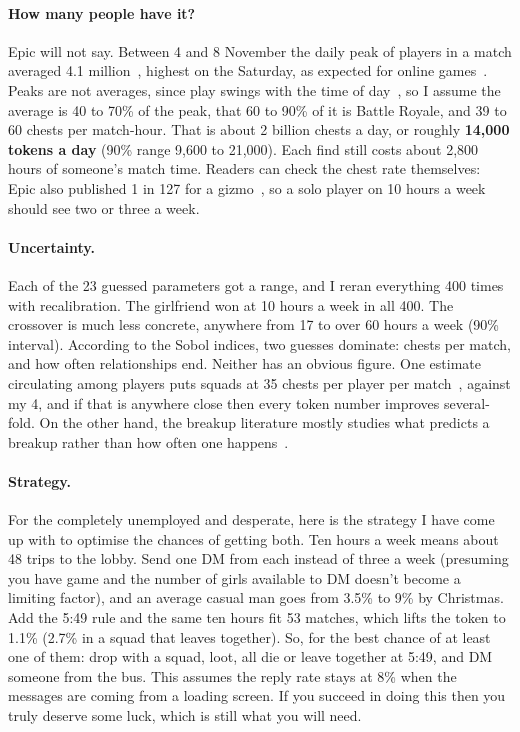 \documentclass[11pt]{article}
\theoremstyle{definition}
\theoremstyle{plain}
\begin{document}
\paragraph{How many people have it?} Epic will not say. Between 4 and 8 November the daily peak of players in a match averaged 4.1 million~\cite{endgame}, highest on the Saturday, as expected for online games~\cite{vihanga}. Peaks are not averages, since play swings with the time of day~\cite{henderson}, so I assume the average is 40 to 70\% of the peak, that 60 to 90\% of it is Battle Royale, and 39 to 60 chests per match-hour. That is about 2 billion chests a day, or roughly \textbf{14{,}000 tokens a day} (90\% range 9{,}600 to 21{,}000). Each find still costs about 2{,}800 hours of someone's match time. Readers can check the chest rate themselves: Epic also published 1 in 127 for a gizmo~\cite{forbes}, so a solo player on 10 hours a week should see two or three a week.

\paragraph{Uncertainty.} Each of the 23 guessed parameters got a range, and I reran everything 400 times with recalibration. The girlfriend won at 10 hours a week in all 400. The crossover is much less concrete, anywhere from 17 to over 60 hours a week (90\% interval). According to the Sobol indices, two guesses dominate: chests per match, and how often relationships end. Neither has an obvious figure. One estimate circulating among players puts squads at 35 chests per player per match~\cite{forbes}, against my 4, and if that is anywhere close then every token number improves several-fold. On the other hand, the breakup literature mostly studies what predicts a breakup rather than how often one happens~\cite{le2010}.

\paragraph{Strategy.} For the completely unemployed and desperate, here is the strategy I have come up with to optimise the chances of getting both. Ten hours a week means about 48 trips to the lobby. Send one DM from each instead of three a week (presuming you have game and the number of girls available to DM doesn't become a limiting factor), and an average casual man goes from 3.5\% to 9\% by Christmas. Add the 5:49 rule and the same ten hours fit 53 matches, which lifts the token to 1.1\% (2.7\% in a squad that leaves together). So, for the best chance of at least one of them: drop with a squad, loot, all die or leave together at 5:49, and DM someone from the bus. This assumes the reply rate stays at 8\% when the messages are coming from a loading screen. If you succeed in doing this then you truly deserve some luck, which is still what you will need.
\end{document}
